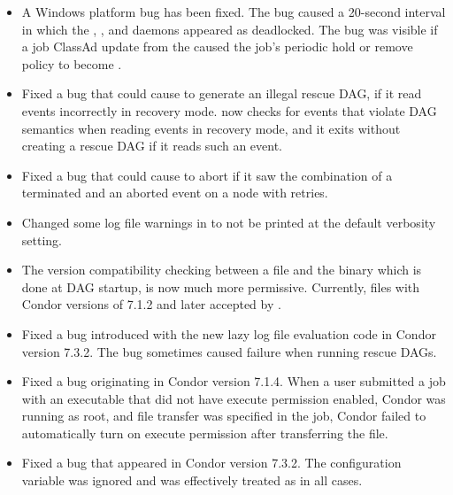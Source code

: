 \begin{itemize}

\item A Windows platform bug has been fixed.
The bug caused a 20-second interval in which
the , , and  daemons
appeared as deadlocked. 
The bug was visible if a job ClassAd update from the  caused
the job's periodic hold or remove policy to become .

\item Fixed a bug that could cause  to generate an
illegal rescue DAG, if it read events incorrectly in recovery mode.
 now checks for events that violate DAG semantics
when reading events in recovery mode, and it exits without creating a
rescue DAG if it reads such an event.

\item Fixed a bug that could cause  to abort if it saw
the combination of a terminated and an aborted event on a node with
retries.

\item Changed some log file warnings in  to not be
printed at the default verbosity setting.

\item The version compatibility checking between a 
file and the  binary which is done at DAG startup,
is now much more permissive.
Currently,  files with
Condor versions of 7.1.2 and later accepted by .

\item Fixed a bug introduced with the new  lazy log file
evaluation code in Condor version 7.3.2.
The bug sometimes caused failure when running rescue DAGs.

\item Fixed a bug originating in Condor version 7.1.4.
When a user submitted a job
with an executable that did not have execute permission enabled,
Condor was running as root, and file transfer was specified in the job,
Condor failed to automatically turn on execute permission after
transferring the file.

\item Fixed a bug that appeared in Condor version 7.3.2.
The configuration variable
 was ignored and was effectively
treated as  in all cases.


\end{itemize}
